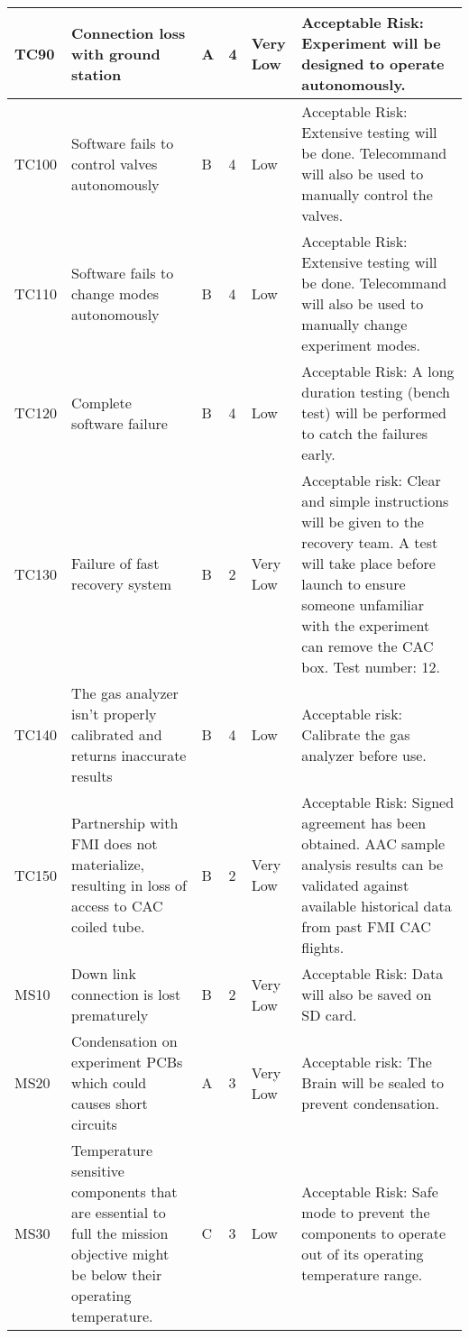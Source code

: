 \begin{longtable}{|m{}| m{} |m{} |m{}|m{}| m{}|}
TC90 & Connection loss with ground station & A & 4 & \cellcolor[HTML]{34FF34}Very Low & Acceptable Risk: Experiment will be designed to operate autonomously. \\ \hline
TC100 & Software fails to control valves autonomously & B & 4 & \cellcolor[HTML]{FCFF2F}Low & Acceptable Risk: Extensive testing will be done. Telecommand will also be used to manually control the valves. \\ \hline
TC110 & Software fails to change modes autonomously & B & 4 & \cellcolor[HTML]{FCFF2F}Low & Acceptable Risk: Extensive testing will be done. Telecommand will also be used to manually change experiment modes. \\ \hline
TC120 & Complete software failure & B & 4 & \cellcolor[HTML]{FCFF2F}Low & Acceptable Risk: A long duration testing (bench test) will be performed to catch the failures early. \\ \hline
TC130 & Failure of fast recovery system & B & 2 & \cellcolor[HTML]{34FF34}Very Low & Acceptable risk: Clear and simple instructions will be given to the recovery team. A test will take place before launch to ensure someone unfamiliar with the experiment can remove the CAC box. Test number: 12. \\ \hline
TC140 & The gas analyzer isn't properly calibrated and returns inaccurate results & B & 4 & \cellcolor[HTML]{FCFF2F}Low & Acceptable risk: Calibrate the gas analyzer before use.\\ \hline
TC150 & Partnership with FMI does not materialize, resulting in loss of access to CAC coiled tube. & B & 2 & \cellcolor[HTML]{34FF34}Very Low & Acceptable Risk: Signed agreement has been obtained. AAC sample analysis results can be validated against available historical data from past FMI CAC flights. \\ \hline 
MS10 & Down link connection is lost prematurely & B & 2 & \cellcolor[HTML]{34FF34}Very Low & Acceptable Risk: Data will also be saved on SD card. \\ \hline
MS20 & Condensation on experiment PCBs which could causes short circuits & A & 3 & \cellcolor[HTML]{34FF34}Very Low & Acceptable risk: The Brain will be sealed to prevent condensation. \\ \hline
MS30 & Temperature sensitive components that are essential to full the mission objective might be below their operating temperature. & C & 3 & \cellcolor[HTML]{FCFF2F}Low & Acceptable Risk: Safe mode to prevent the components to operate out of its operating temperature range. \\ \hline

\end{longtable}

